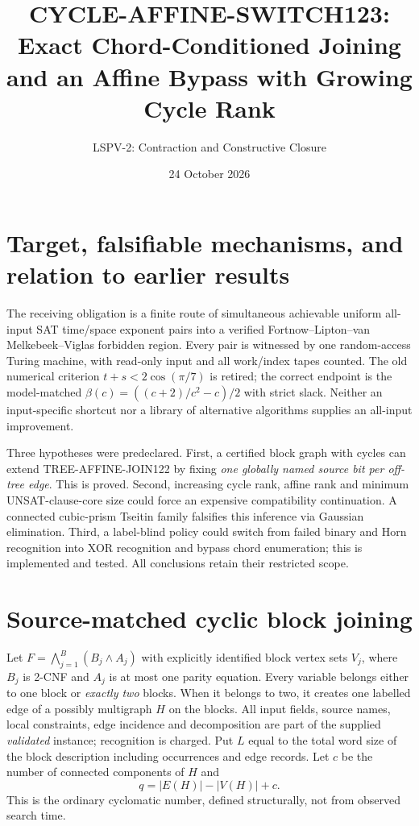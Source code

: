 \documentclass[11pt]{article}
\title{CYCLE-AFFINE-SWITCH123: Exact Chord-Conditioned Joining and an Affine Bypass with Growing Cycle Rank}
\author{LSPV-2: Contraction and Constructive Closure}
\date{24 October 2026}
\begin{document}
\maketitle
\begin{center}\end{center}

\section{Target, falsifiable mechanisms, and relation to earlier results}
The receiving obligation is a finite route of simultaneous achievable uniform all-input SAT time/space exponent pairs into a verified Fortnow--Lipton--van Melkebeek--Viglas forbidden region. Every pair is witnessed by one random-access Turing machine, with read-only input and all work/index tapes counted. The old numerical criterion $t+s<2\cos(\pi/7)$ is retired; the correct endpoint is the model-matched $\beta(c)=((c+2)/c^2-c)/2$ with strict slack. Neither an input-specific shortcut nor a library of alternative algorithms supplies an all-input improvement.

Three hypotheses were predeclared. First, a certified block graph with cycles can extend TREE-AFFINE-JOIN122 by fixing \emph{one globally named source bit per off-tree edge}. This is proved. Second, increasing cycle rank, affine rank and minimum UNSAT-clause-core size could force an expensive compatibility continuation. A connected cubic-prism Tseitin family falsifies this inference via Gaussian elimination. Third, a label-blind policy could switch from failed binary and Horn recognition into XOR recognition and bypass chord enumeration; this is implemented and tested. All conclusions retain their restricted scope.

\section{Source-matched cyclic block joining}
Let $F=\bigwedge_{j=1}^{B}(B_j\wedge A_j)$ with explicitly identified block vertex sets $V_j$, where $B_j$ is 2-CNF and $A_j$ is at most one parity equation. Every variable belongs either to one block or \emph{exactly two} blocks. When it belongs to two, it creates one labelled edge of a possibly multigraph $H$ on the blocks. All input fields, source names, local constraints, edge incidence and decomposition are part of the supplied \emph{validated} instance; recognition is charged. Put $L$ equal to the total word size of the block description including occurrences and edge records. Let $c$ be the number of connected components of $H$ and
\[
q=|E(H)|-|V(H)|+c.
\]
This is the ordinary cyclomatic number, defined structurally, not from observed search time.
\end{document}
